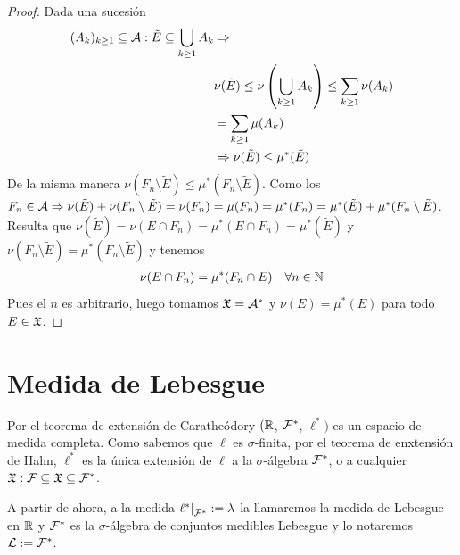 \begin{theorem}
\begin{proof}
        Dada una sucesión \begin{align*}
            (A_k)_{k \geq 1} \subseteq \mathcal{A} : \tilde{E} \subseteq \bigcup_{k \geq 1} A_k & \Rightarrow                                                                              \\
                                                                                           & \nu(\tilde{E}) \leq \nu\left(\bigcup_{k \geq 1} A_k\right) \leq \sum_{k \geq 1} \nu(A_k) \\
                                                                                           & = \sum_{k \geq 1} \mu(A_k)                                                               \\
                                                                                           & \Rightarrow \nu(\tilde{E}) \leq \mu^*(\tilde{E})
        \end{align*}
        De la misma manera \(\nu(F_n \setminus \tilde{E}) \leq \mu^*(F_n \setminus \tilde{E})\).
        Como los \(F_n \in \mathcal{A} \Rightarrow \nu(\tilde{E}) + \nu(F_n \setminus \tilde{E}) = \nu(F_n) = \mu(F_n) = \mu^*(F_n) = \mu^*(\tilde{E}) + \mu^*(F_n \setminus \tilde{E})\).
        Resulta que \(\nu(\tilde{E}) = \nu(E \cap F_n) = \mu^*(E \cap F_n) = \mu^*(\tilde{E})\) y \(\nu(F_n \setminus \tilde{E}) = \mu^*(F_n \setminus \tilde{E})\) y tenemos \begin{align*}
            \nu(E \cap F_n) = \mu^*(F_n \cap E) \quad \forall n \in \mathbb{N}
        \end{align*}
        Pues el \(n\) es arbitrario, luego tomamos \(\mathfrak{X} = \mathcal{A}^*\) y \(\nu(E) = \mu^*(E)\) para todo \(E \in \mathfrak{X}\).
    \end{proof}
\end{theorem}

\section{Medida de Lebesgue}

Por el teorema de extensión de Caratheódory \((\mathbb{R}\), \(\mathcal{F}^*\), \(\ell^*)\) es un espacio de medida completa.
Como sabemos que \(\ell\) es \(\sigma\)-finita, por el teorema de enxtensión de Hahn, \(\ell^*\) es la única extensión de \(\ell\) a la \(\sigma\)-álgebra \(\mathcal{F}^*\),
o a cualquier \(\mathfrak{X} : \mathcal{F} \subseteq \mathfrak{X} \subseteq \mathcal{F}^*\).

A partir de ahora, a la medida \(\restr{\ell^*}{\mc{F}^*} := \lambda\) la llamaremos la medida de Lebesgue en \(\mathbb{R}\) y \(\mathcal{F}^*\) es la \(\sigma\)-álgebra de conjuntos
medibles Lebesgue y lo notaremos \(\mathcal{L} := \mathcal{F}^*\).

